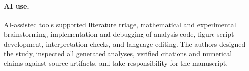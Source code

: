 \documentclass{article}
\begin{document}
\paragraph{AI use.}
AI-assisted tools supported literature triage, mathematical and experimental
brainstorming, implementation and debugging of analysis code, figure-script
development, interpretation checks, and language editing. The authors designed
the study, inspected all generated analyses, verified citations and numerical
claims against source artifacts, and take responsibility for the manuscript.



\end{document}
